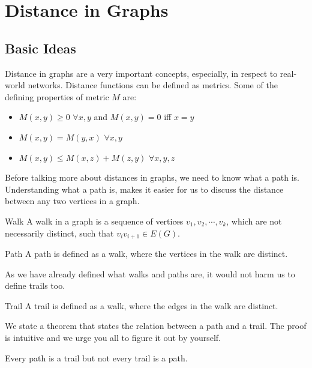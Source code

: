 \documentclass[../basic_graph_theory.tex]{subfiles}
\begin{document}
\chapter{Distance in Graphs}
\setcounter{chapter}{2} %
\setcounter{section}{0}
\setcounter{equation}{2}
\setcounter{figure}{2}

\section{Basic Ideas}
Distance in graphs are a very important concepts, especially, in respect to real-world networks. Distance functions can be defined as metrics. Some of the defining properties of metric $M$ are:
\begin{itemize}
    \item $M(x,y) \ge 0$ $\forall x,y$ and $M(x,y)=0$ iff $x=y$
    \item $M(x,y)=M(y,x)$ $\forall x,y$
    \item $M(x,y) \le M(x,z)+M(z,y)$ $\forall x,y,z$
\end{itemize}

Before talking more about distances in graphs, we need to know what a path is. Understanding what a path is, makes it easier for us to discuss the distance between any two vertices in a graph.

\begin{Def}{Walk}{}
    A walk in a graph is a sequence of vertices $v_1, v_2,\cdots, v_k$, which are not necessarily distinct, such that $v_iv_{i+1} \in E(G)$.
\end{Def}

\begin{Def}{Path}{}
    A path is defined as a walk, where the vertices in the walk are distinct.
\end{Def}

As we have already defined what walks and paths are, it would not harm us to define trails too.

\begin{Def}{Trail}{}
    A trail is defined as a walk, where the edges in the walk are distinct.
\end{Def}

We state a theorem that states the relation between a path and a trail. The proof is intuitive and we urge you all to figure it out by yourself.

\begin{Thm}{}{}
    Every path is a trail but not every trail is a path.
\end{Thm}{}{}
\end{document}
